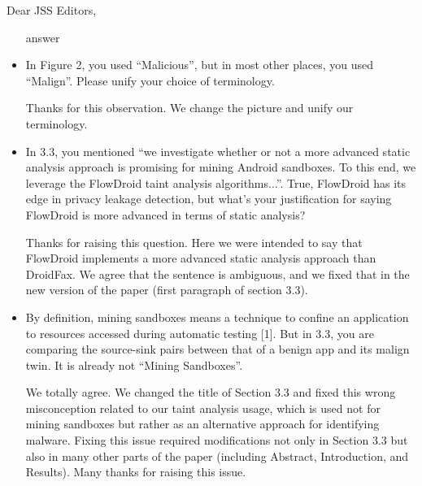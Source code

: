 \documentclass[12pt,english]{scrlttr2}
\begin{document}
\begin{letter}{Dear JSS Editors,}
\begin{itemize}
\vspace{0.2cm}

{\color{blue}{\bf Answer.} answer}

\vspace{0.2cm}

\item In Figure 2, you used ``Malicious'', but in most other places, you used ``Malign''. Please unify your choice of terminology.


\vspace{0.2cm}

{\color{blue}{\bf Answer.} Thanks for this observation. We change the picture and unify our terminology.}

\vspace{0.2cm}

\item In 3.3, you mentioned ``we investigate whether or not a more advanced static analysis approach is promising for mining 
Android sandboxes. To this end, we leverage the FlowDroid taint analysis algorithms...''. True, FlowDroid has its edge 
in privacy leakage detection, but what's your justification for saying FlowDroid is more advanced in terms of static analysis?


\vspace{0.2cm}

{\color{blue}{\bf Answer.} Thanks for raising this question. Here we were intended to say that FlowDroid implements a more advanced static analysis approach than DroidFax. We agree that the sentence is ambiguous, and we fixed that in the new version of the paper (first paragraph
  of section 3.3).}

\vspace{0.2cm}

\item By definition, mining sandboxes means a technique to confine an application to resources accessed during automatic 
testing [1]. But in 3.3, you are comparing the source-sink pairs between that of a benign app and its malign twin. It is already 
not ``Mining Sandboxes''.

\vspace{0.2cm}

{\color{blue}{\bf Answer.} We totally agree. We changed the title of Section 3.3 and fixed this wrong misconception related to our taint analysis usage, which is used not for mining sandboxes but rather as an alternative approach for identifying malware. Fixing this issue required modifications not only in Section 3.3 but also in many other parts of the paper (including Abstract, Introduction, and Results). Many thanks for raising this issue.}



\end{itemize}
\end{letter}
\end{document}
